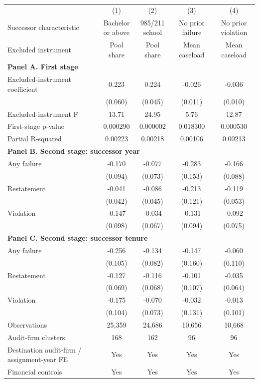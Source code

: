 \begin{tabular}{p{6.3cm}cccc}
\toprule
 & (1) & (2) & (3) & (4) \\
Successor characteristic & \shortstack{Bachelor\\or above} & \shortstack{985/211\\school} & \shortstack{No prior\\failure} & \shortstack{No prior\\violation} \\
Excluded instrument & Pool share & Pool share & Mean caseload & Mean caseload \\
\midrule
\multicolumn{5}{l}{\textbf{Panel A. First stage}} \\
Excluded-instrument coefficient & 0.223\sym{***} & 0.224\sym{***} & -0.026\sym{**} & -0.036\sym{***} \\
 & (0.060) & (0.045) & (0.011) & (0.010) \\
Excluded-instrument F & 13.71 & 24.95 & 5.76 & 12.87 \\
First-stage p-value & 0.000290 & 0.000002 & 0.018300 & 0.000530 \\
Partial R-squared & 0.00223 & 0.00218 & 0.00106 & 0.00213 \\
\midrule
\multicolumn{5}{l}{\textbf{Panel B. Second stage: successor year}} \\
Any failure & -0.170\sym{*} & -0.077 & -0.283\sym{*} & -0.166\sym{*} \\
 & (0.094) & (0.073) & (0.153) & (0.088) \\
Restatement & -0.041 & -0.086\sym{*} & -0.213\sym{*} & -0.119\sym{**} \\
 & (0.042) & (0.045) & (0.121) & (0.053) \\
Violation & -0.147 & -0.034 & -0.131 & -0.092 \\
 & (0.098) & (0.067) & (0.094) & (0.075) \\
\midrule
\multicolumn{5}{l}{\textbf{Panel C. Second stage: successor tenure}} \\
Any failure & -0.256\sym{**} & -0.134 & -0.147 & -0.060 \\
 & (0.105) & (0.082) & (0.160) & (0.110) \\
Restatement & -0.127\sym{*} & -0.116\sym{*} & -0.101 & -0.035 \\
 & (0.069) & (0.068) & (0.107) & (0.064) \\
Violation & -0.175\sym{*} & -0.070 & -0.032 & -0.013 \\
 & (0.104) & (0.073) & (0.131) & (0.101) \\
\midrule
Observations & 25,359 & 24,686 & 10,656 & 10,668 \\
Audit-firm clusters & 168 & 162 & 96 & 96 \\
Destination audit-firm / assignment-year FE & Yes & Yes & Yes & Yes \\
Financial controls & Yes & Yes & Yes & Yes \\
\bottomrule
\end{tabular}
